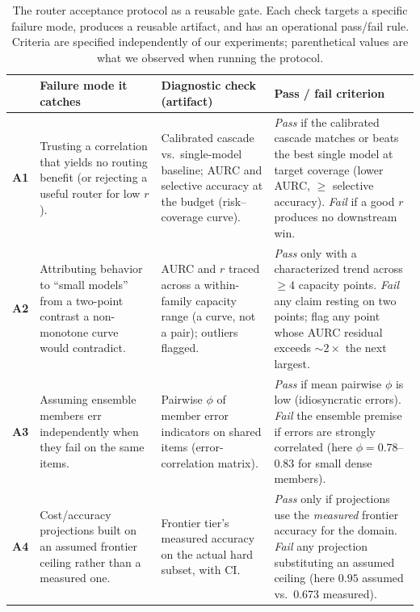 \documentclass[letterpaper]{article} %
\begin{document}
\begin{table}[t]
\centering
\small
\begin{tabular}{p{}p{}p{}p{}}
\toprule
& \textbf{Failure mode it catches} & \textbf{Diagnostic check (artifact)} & \textbf{Pass / fail criterion} \\
\midrule
\textbf{A1} & Trusting a correlation that yields no routing benefit (or rejecting a useful router for low $r$). & Calibrated cascade vs.\ single-model baseline; AURC and selective accuracy at the budget (risk--coverage curve). & \emph{Pass} if the calibrated cascade matches or beats the best single model at target coverage (lower AURC, $\ge$ selective accuracy). \emph{Fail} if a good $r$ produces no downstream win. \\
\addlinespace
\textbf{A2} & Attributing behavior to ``small models'' from a two-point contrast a non-monotone curve would contradict. & AURC and $r$ traced across a within-family capacity range (a curve, not a pair); outliers flagged. & \emph{Pass} only with a characterized trend across $\ge\!4$ capacity points. \emph{Fail} any claim resting on two points; flag any point whose AURC residual exceeds ${\sim}2\times$ the next largest. \\
\addlinespace
\textbf{A3} & Assuming ensemble members err independently when they fail on the same items. & Pairwise $\phi$ of member error indicators on shared items (error-correlation matrix). & \emph{Pass} if mean pairwise $\phi$ is low (idiosyncratic errors). \emph{Fail} the ensemble premise if errors are strongly correlated (here $\phi{=}0.78$--$0.83$ for small dense members). \\
\addlinespace
\textbf{A4} & Cost/accuracy projections built on an assumed frontier ceiling rather than a measured one. & Frontier tier's measured accuracy on the actual hard subset, with CI. & \emph{Pass} only if projections use the \emph{measured} frontier accuracy for the domain. \emph{Fail} any projection substituting an assumed ceiling (here $0.95$ assumed vs.\ $0.673$ measured). \\
\bottomrule
\end{tabular}
\caption{The router acceptance protocol as a reusable gate. Each check targets a
specific failure mode, produces a reusable artifact, and has an operational
pass/fail rule. Criteria are specified independently of our experiments;
parenthetical values are what we observed when running the protocol.}
\label{tab:protocol}
\end{table}
\end{document}
